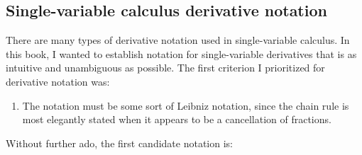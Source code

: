 \begin{comment}
Using the power rule for integer exponents, we have

\textbf{WE MUST ASSUME $c$ is an integer to use the power rule, which blocks us from obtaining the desired deriative.}

\begin{align*}
   \frac{df_{a,c}}{db}\Big|_b = c(c - 1) ... (c - k + 1)(a + b)^{c - k} = ({}_c C_k k!) (a + b)^{c - k},
\end{align*}

so $\frac{df_{a,c}}{db}\Big|_0 = ({}_c C_k k!) a^{c - k}$, and thus the Taylor series for $f_{a,c}$ centered at $0$ is

\begin{align*}
   T(b) = \sum_{k = 0}^\infty \frac{1}{k!} \frac{df_{a,c}}{db}\Big|_0 b^k = \sum_{k = 0}^\infty \frac{1}{k!} ({}_c C_k k!) a^{c - k} b^k = \sum_{k = 0}^\infty {}_c C_k a^{c - k} b^k.
\end{align*}

Letting $T_k$ denote the $k$th term of the Taylor series, we have $\lim_{k \rightarrow \infty} \Big| \frac{T_{k + 1}}{T_k} \Big| = \lim_{k \rightarrow \infty} \Big| \frac{n - k}{k + 1}a^{-1}b \Big|$. The ratio test states that if $a, b$ are such that $\lim_{k \rightarrow \infty} \Big| \frac{T_{k + 1}}{T_k} \Big| < 1$, then we have $f_{a,c}(b) = T(b)$. Using the previous expression for $\lim_{k \rightarrow \infty} \Big| \frac{T_{k + 1}}{T_k} \Big| < 1$ shows that we have $f_{a,c}(b) = T(b)$ when $|b| < |a|$.
\end{comment}

\subsection*{Single-variable calculus derivative notation}

There are many types of derivative notation used in single-variable calculus. In this book, I wanted to establish notation for single-variable derivatives that is as intuitive and unambiguous as possible. The first criterion I prioritized for derivative notation was:

\begin{enumerate}
    \item The notation must be some sort of Leibniz notation, since the chain rule is most elegantly stated when it appears to be a cancellation of fractions.
\end{enumerate}

Without further ado, the first candidate notation is:

